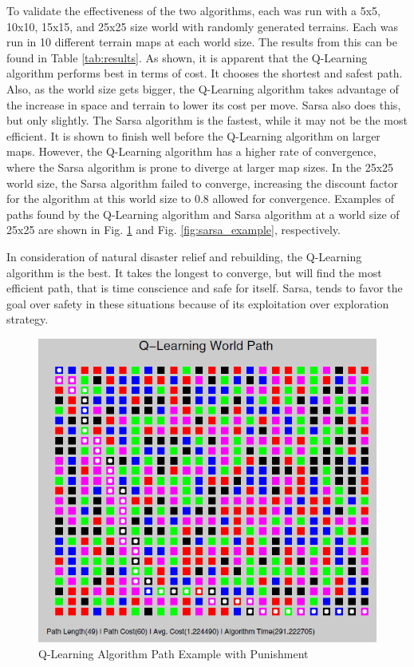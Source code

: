 \documentclass[12pt,american]{report}
\begin{document}
To validate the effectiveness of the two algorithms, each was run with a 5x5, 10x10, 15x15, and 25x25 size world with randomly generated terrains.  Each was run in 10 different terrain maps at each world size.  The results from this can be found in Table \ref{tab:results}.  As shown, it is apparent that the Q-Learning algorithm performs best in terms of cost.  It chooses the shortest and safest path. Also, as the world size gets bigger, the Q-Learning algorithm takes advantage of the increase in space and terrain to lower its cost per move. Sarsa also does this, but only slightly.  The Sarsa algorithm is the fastest, while it may not be the most efficient.  It is shown to finish well before the Q-Learning algorithm on larger maps.  However, the Q-Learning algorithm has a higher rate of convergence, where the Sarsa algorithm is prone to diverge at larger map sizes.  In the 25x25 world size, the Sarsa algorithm failed to converge, increasing the discount factor for the algorithm at this world size to 0.8 allowed for convergence. Examples of paths found by the Q-Learning algorithm and Sarsa algorithm at a world size of 25x25 are shown in Fig. \ref{fig:q-learning example} and Fig. \ref{fig:sarsa_example}, respectively.

In consideration of natural disaster relief and rebuilding, the Q-Learning algorithm is the best.  It takes the longest to converge, but will find the most efficient path, that is time conscience and safe for itself.  Sarsa, tends to favor the goal over safety in these situations because of its exploitation over exploration strategy. 


\begin{figure}
\centering
\includegraphics[scale=.5]{images/q-learning-example.PNG}
\caption{Q-Learning Algorithm Path Example with Punishment}
\label{fig:q-learning example}
\end{figure}
\end{document}
